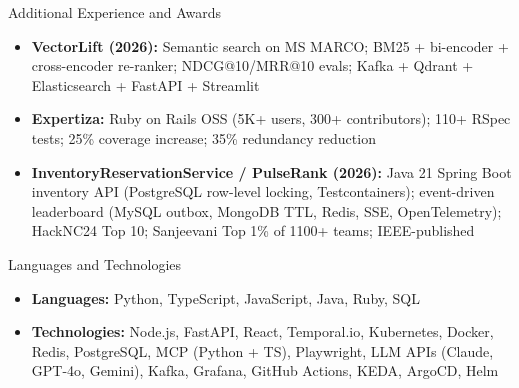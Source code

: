 \documentclass{mcdowellcv}
\begin{document}
\begin{cvsection}{Additional Experience and Awards}

  \begin{cvsubsection}{}{}{}
    \begin{itemize}
      \item \textbf{VectorLift (2026):} Semantic search on MS MARCO; BM25 + bi-encoder + cross-encoder re-ranker; NDCG@10/MRR@10 evals; Kafka + Qdrant + Elasticsearch + FastAPI + Streamlit
      \item \textbf{Expertiza:} Ruby on Rails OSS (5K+ users, 300+ contributors); 110+ RSpec tests; 25\% coverage increase; 35\% redundancy reduction
      \item \textbf{InventoryReservationService / PulseRank (2026):} Java 21 Spring Boot inventory API (PostgreSQL row-level locking, Testcontainers); event-driven leaderboard (MySQL outbox, MongoDB TTL, Redis, SSE, OpenTelemetry); HackNC24 Top 10; Sanjeevani Top 1\% of 1100+ teams; IEEE-published
    \end{itemize}
  \end{cvsubsection}

\end{cvsection}

\begin{cvsection}{Languages and Technologies}

  \begin{cvsubsection}{}{}{}
    \begin{itemize}
      \item \textbf{Languages:} Python, TypeScript, JavaScript, Java, Ruby, SQL
      \item \textbf{Technologies:} Node.js, FastAPI, React, Temporal.io, Kubernetes, Docker, Redis, PostgreSQL, MCP (Python + TS), Playwright, LLM APIs (Claude, GPT-4o, Gemini), Kafka, Grafana, GitHub Actions, KEDA, ArgoCD, Helm
    \end{itemize}
  \end{cvsubsection}

\end{cvsection}
\end{document}
